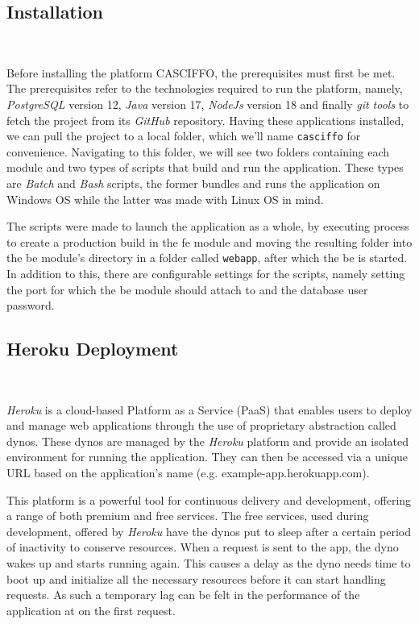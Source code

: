 \subsection{Installation}~\label{ch:impl:sec:install-deploy:ss-installation}

Before installing the platform CASCIFFO, the prerequisites must first be met. The prerequisites refer to the technologies required to run the platform, namely, \textit{PostgreSQL} version 12, \textit{Java} version 17, \textit{NodeJs} version 18 and finally \textit{git tools} to fetch the project from its \textit{GitHub} repository.
Having these applications installed, we can pull the project to a local folder, which we'll name \lstinline{casciffo} for convenience. Navigating to this folder, we will see two folders containing each module and two types of scripts that build and run the application. These types are \textit{Batch} and \textit{Bash} scripts, the former bundles and runs the application on Windows OS while the latter was made with Linux OS in mind. 

The scripts were made to launch the application as a whole, by executing process to create a production build in the \acrshort{fe} module and moving the resulting folder into the \acrshort{be} module's directory in a folder called \lstinline{webapp}, after which the \acrshort{be} is started. 
In addition to this, there are configurable settings for the scripts, namely setting the port for which the \acrshort{be} module should attach to and the database user password.


\subsection{Heroku Deployment}~\label{ch:impl:sec:install-deploy:ss:heroku}

\textit{Heroku} is a cloud-based Platform as a Service (PaaS) that enables users to deploy and manage web applications through the use of proprietary abstraction called dynos. These dynos are managed by the \textit{Heroku} platform and provide an isolated environment for running the application. They can then be accessed via a unique URL based on the application's name (e.g. example-app.herokuapp.com).

This platform is a powerful tool for continuous delivery and development, offering a range of both premium and free services. The free services, used during development, offered by \textit{Heroku} have the dynos put to sleep after a certain period of inactivity to conserve resources. When a request is sent to the app, the dyno wakes up and starts running again. This causes a delay as the dyno needs time to boot up and initialize all the necessary resources before it can start handling requests. As such a temporary lag can be felt in the performance of the application at on the first request. 

